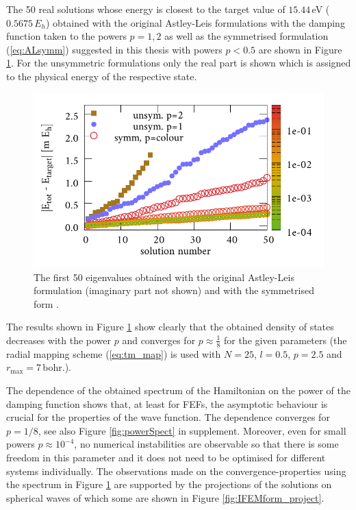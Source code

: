 The 50 real solutions whose energy is closest to the target value of $15.44\,$eV ($0.5675\,E_h$) obtained with the original Astley-Leis formulations with the damping function taken to the powers $p=1,2$ as well as the symmetrised formulation (\ref{eq:ALsymm}) suggested in this thesis with powers $p<0.5$ are shown in Figure \ref{fig:IFEMform_spect}.
For the unsymmetric formulations only the real part is shown which is assigned to the physical energy of the respective state.
\begin{figure}
\includegraphics[width=\textwidth]{Figures/IFem_form_spectra}
\caption{The first 50 eigenvalues obtained with the original Astley-Leis formulation (imaginary part not shown) and with the symmetrised form .}
\label{fig:IFEMform_spect}
\end{figure}
The results shown in Figure \ref{fig:IFEMform_spect} show clearly that the obtained density of states decreases with the power $p$ and converges for $p\approx \frac 18$ for the given parameters (the radial mapping scheme (\ref{eq:tm_map}) is used with $N=25$, $l=0.5$, $p=2.5$ and $r_\text{max}=7\,$bohr.).

The dependence of the obtained spectrum of the Hamiltonian on the power of the damping function shows that, at least for FEFs, the asymptotic behaviour is crucial for the properties of the wave function. 
The dependence converges for $p=1/8$, see also Figure \ref{fig:powerSpect} in supplement.
Moreover, even for small powers $p\approx 10^{-4}$, no numerical instabilities are observable so that there is some freedom in this parameter and it does not need to be optimised for different systems individually.
The observations made on the convergence-properties using the spectrum in Figure \ref{fig:IFEMform_spect} are supported by the projections of the solutions on spherical waves of which some are shown in Figure \ref{fig:IFEMform_project}.

